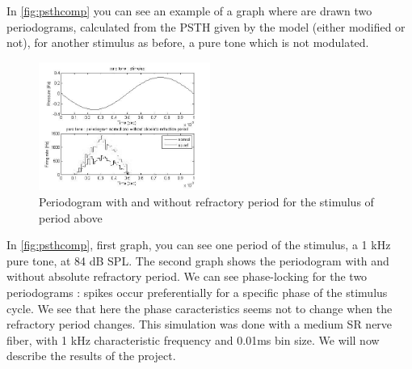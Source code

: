 In \autoref{fig:psthcomp} you can see an example of a graph
where are drawn two periodograms, calculated from the PSTH given by the model 
(either modified or not), for another stimulus as before, a pure tone
which is not modulated.


\begin{figure}[h]
	\centering
	\includegraphics[width=0.5\textwidth]{images/stim-psth-puretone-bw2.jpg}
	\caption{Periodogram with and without refractory period for the stimulus of period above}
	\label{fig:psthcomp}
\end{figure} 

In \autoref{fig:psthcomp}, first graph, you can see one period of the stimulus, 
a 1 kHz pure tone, at 84 dB SPL.
The second graph shows the periodogram with and without absolute refractory period.
We can see phase-locking for the two periodograms : spikes occur preferentially 
for a specific phase of the stimulus cycle. We see that here the phase caracteristics 
 seems not to change when the refractory period changes.
This simulation was done with a medium SR nerve fiber, 
with 1 kHz characteristic frequency and 0.01ms bin size.
We will now describe the results of the project.


